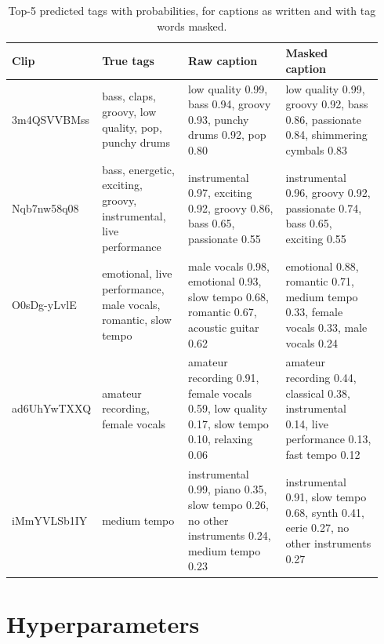 \documentclass{article}
\begin{document}
\begin{table}[h]
  \caption{Top-5 predicted tags with probabilities, for captions as written and with tag words masked.}
  \centering
  \scriptsize
  \setlength{\tabcolsep}{3pt}
  \begin{tabular}{p{0.14\linewidth}p{0.24\linewidth}p{0.28\linewidth}p{0.28\linewidth}}
    \toprule
    Clip & True tags & Raw caption & Masked caption \\
    \midrule
    3m4QSVVBMss & bass, claps, groovy, low quality, pop, punchy drums &
      low quality 0.99, bass 0.94, groovy 0.93, punchy drums 0.92, pop 0.80 &
      low quality 0.99, groovy 0.92, bass 0.86, passionate 0.84, shimmering cymbals 0.83 \\
    Nqb7nw58q08 & bass, energetic, exciting, groovy, instrumental, live performance &
      instrumental 0.97, exciting 0.92, groovy 0.86, bass 0.65, passionate 0.55 &
      instrumental 0.96, groovy 0.92, passionate 0.74, bass 0.65, exciting 0.55 \\
    O0sDg-yLvlE & emotional, live performance, male vocals, romantic, slow tempo &
      male vocals 0.98, emotional 0.93, slow tempo 0.68, romantic 0.67, acoustic guitar 0.62 &
      emotional 0.88, romantic 0.71, medium tempo 0.33, female vocals 0.33, male vocals 0.24 \\
    ad6UhYwTXXQ & amateur recording, female vocals &
      amateur recording 0.91, female vocals 0.59, low quality 0.17, slow tempo 0.10, relaxing 0.06 &
      amateur recording 0.44, classical 0.38, instrumental 0.14, live performance 0.13, fast tempo 0.12 \\
    iMmYVLSb1IY & medium tempo &
      instrumental 0.99, piano 0.35, slow tempo 0.26, no other instruments 0.24, medium tempo 0.23 &
      instrumental 0.91, slow tempo 0.68, synth 0.41, eerie 0.27, no other instruments 0.27 \\
    \bottomrule
  \end{tabular}
\end{table}

\section{Hyperparameters}
\label{app:hyper}
\end{document}
